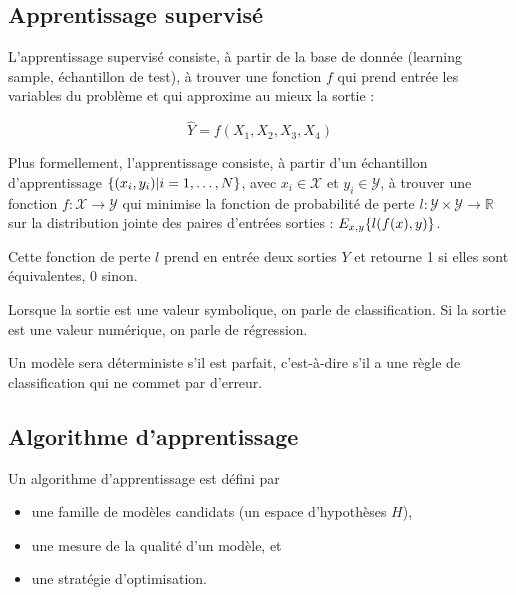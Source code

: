 	
	
		\subsection{Apprentissage supervisé}
		
		L'apprentissage supervisé consiste, à partir de la base de donnée (learning sample, échantillon de test), à trouver une fonction $f$ qui prend entrée les variables du problème et qui approxime au mieux la sortie :

		$$\hat{Y} = f(X_1, X_2, X_3, X_4)$$

		Plus formellement, l'apprentissage consiste, à partir d'un échantillon d'apprentissage $\lbrace (x_i, y_i) \vert i = 1, \dots , N \rbrace$, avec $x_i \in \mathcal{X}$ et $y_i \in \mathcal{Y}$, à trouver une fonction $f : \mathcal{X} \rightarrow \mathcal{Y}$ qui minimise la fonction de probabilité de perte $l : \mathcal{Y} \times \mathcal{Y} \rightarrow \mathbb{R}$ sur la distribution jointe des paires d'entrées sorties : $E_{x, y} \lbrace l(f(x), y) \rbrace$.

		Cette fonction de perte $l$ prend en entrée deux sorties $Y$ et retourne 1 si elles sont équivalentes, 0 sinon.

		Lorsque la sortie est une valeur symbolique, on parle de classification. Si la sortie est une valeur numérique, on parle de régression.

		Un modèle sera déterministe s'il est parfait, c'est-à-dire s'il a une règle de classification qui ne commet par d'erreur.
		
		\subsection{Algorithme d'apprentissage}
		
		Un algorithme d'apprentissage est défini par

		\begin{itemize}
			\item une famille de modèles candidats (un espace d'hypothèses $H$),
			\item une mesure de la qualité d'un modèle, et
			\item une stratégie d'optimisation.
		\end{itemize}

